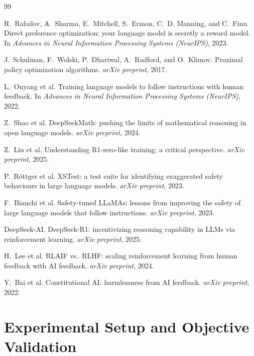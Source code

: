 \documentclass{article}
\begin{document}
\clearpage

\begin{thebibliography}{99}

R.~Rafailov, A.~Sharma, E.~Mitchell, S.~Ermon, C.~D. Manning, and C.~Finn.
\newblock Direct preference optimization: your language model is secretly a reward model.
\newblock In \emph{Advances in Neural Information Processing Systems (NeurIPS)}, 2023.

J.~Schulman, F.~Wolski, P.~Dhariwal, A.~Radford, and O.~Klimov.
\newblock Proximal policy optimization algorithms.
\newblock \emph{arXiv preprint}, 2017.

L.~Ouyang et al.
\newblock Training language models to follow instructions with human feedback.
\newblock In \emph{Advances in Neural Information Processing Systems (NeurIPS)}, 2022.

Z.~Shao et al.
\newblock DeepSeekMath: pushing the limits of mathematical reasoning in open language models.
\newblock \emph{arXiv preprint}, 2024.

Z.~Liu et al.
\newblock Understanding R1-zero-like training: a critical perspective.
\newblock \emph{arXiv preprint}, 2025.

P.~R\"ottger et al.
\newblock XSTest: a test suite for identifying exaggerated safety behaviours in large language models.
\newblock \emph{arXiv preprint}, 2023.

F.~Bianchi et al.
\newblock Safety-tuned LLaMAs: lessons from improving the safety of large language models that follow instructions.
\newblock \emph{arXiv preprint}, 2023.

DeepSeek-AI.
\newblock DeepSeek-R1: incentivizing reasoning capability in LLMs via reinforcement learning.
\newblock \emph{arXiv preprint}, 2025.

H.~Lee et al.
\newblock RLAIF vs.\ RLHF: scaling reinforcement learning from human feedback with AI feedback.
\newblock \emph{arXiv preprint}, 2024.

Y.~Bai et al.
\newblock Constitutional AI: harmlessness from AI feedback.
\newblock \emph{arXiv preprint}, 2022.

\end{thebibliography}

\clearpage
\appendix
\section{Experimental Setup and Objective Validation}
\label{sec:setup}
\end{document}
